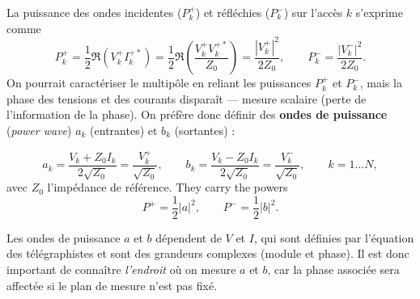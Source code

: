 La puissance des ondes incidentes ($P_k^{+}$) et réfléchies ($P_k^{-}$) sur l'accès $k$
s'exprime comme
\[P_k^{+} = \frac{1}{2}\Re\!\left(V_k^{+} I_k^{+*}\right)
          = \frac{1}{2}\Re\!\left(\frac{V_k^{+} V_k^{+*}}{Z_0}\right)
          = \frac{\left|V_k^{+}\right|^2}{2 Z_0},
  \qquad
  P_k^{-} = \frac{\left|V_k^{-}\right|^2}{2 Z_0}.\]
On pourrait caractériser le multipôle en reliant les puissances $P_k^{+}$ et $P_k^{-}$,
mais la phase des tensions et des courants disparaît --- mesure scalaire (perte de
l'information de la phase). On préfère donc définir des \textbf{ondes de puissance}
(\textit{power wave}) $a_k$ (entrantes) et $b_k$ (sortantes) :

\begin{definition}
  \[\boxed{\;
    a_k = \frac{V_k + Z_0 I_k}{2\sqrt{Z_0}} = \frac{V_k^{+}}{\sqrt{Z_0}},
    \qquad
    b_k = \frac{V_k - Z_0 I_k}{2\sqrt{Z_0}} = \frac{V_k^{-}}{\sqrt{Z_0}},
    \qquad k = 1 \dots N,\;}\]
  avec $Z_0$ l'impédance de référence. They carry the powers
  \[P^{+} = \frac{1}{2}\left|a\right|^2, \qquad P^{-} = \frac{1}{2}\left|b\right|^2.\]
\end{definition}

\begin{remark}
  Les ondes de puissance $a$ et $b$ dépendent de $V$ et $I$, qui sont définies par
  l'équation des télégraphistes et sont des grandeurs complexes (module et phase). Il
  est donc important de connaître \emph{l'endroit} où on mesure $a$ et $b$, car la
  phase associée sera affectée si le plan de mesure n'est pas fixé.
\end{remark}


